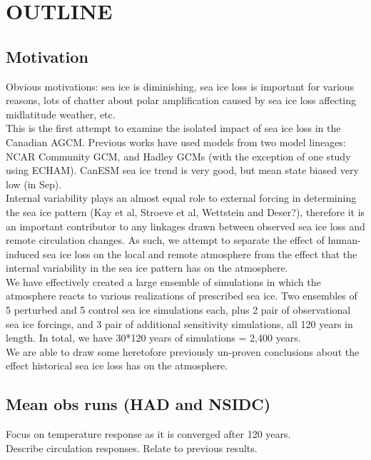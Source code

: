 \documentclass[twocol]{ametsoc}
\begin{document}

\section{OUTLINE}

\subsection{Motivation}

Obvious motivations: sea ice is diminishing, sea ice loss is important for various reasons, lots of chatter about polar amplification caused by sea ice loss affecting midlatitude weather, etc.\\
This is the first attempt to examine the isolated impact of sea ice loss in the Canadian AGCM. Previous works have used models from two model lineages: NCAR Community GCM, and Hadley GCMs (with the exception of one study using ECHAM). CanESM sea ice trend is very good, but mean state biased very low (in Sep).\\
Internal variability plays an almost equal role to external forcing in determining the sea ice pattern (Kay et al, Stroeve et al, Wettstein and Deser?), therefore it is an important contributor to any linkages drawn between observed sea ice loss and remote circulation changes. As such, we attempt to separate the effect of human-induced sea ice loss on the local and remote atmosphere from the effect that the internal variability in the sea ice pattern has on the atmosphere.\\
We have effectively created a large ensemble of simulations in which the atmosphere reacts to various realizations of prescribed sea ice. Two ensembles of 5 perturbed and 5 control sea ice simulations each, plus 2 pair of observational sea ice forcings, and 3 pair of additional sensitivity simulations, all 120 years in length. In total, we have 30*120 years of simulations = 2,400 years.\\
We are able to draw some heretofore previously un-proven conclusions about the effect historical sea ice loss has on the atmosphere.

\subsection{Mean obs runs (HAD and NSIDC)}
Focus on temperature response as it is converged after 120 years.\\
Describe circulation responses. Relate to previous results.\\
\end{document}
